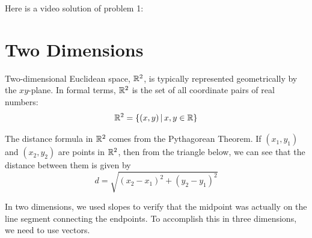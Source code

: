 \documentclass[handout]{ximera}
\begin{document}
Here is a video solution of problem 1:\\
\begin{foldable}
\end{foldable}


\section{Two Dimensions}
Two-dimensional Euclidean space, $\mathbb R^2$, is typically represented geometrically by the $xy$-plane. 
In formal terms, $\mathbb R^2$ is the set of all coordinate pairs of real numbers:
 \[
\mathbb R^2 = \{(x,y) \,|\, x, y \in \mathbb R\}
\]

The distance formula in $\mathbb R^2$ comes from the Pythagorean Theorem. If $(x_1, y_1)$ and $(x_2, y_2)$ are points in $\mathbb R^2$, then from the triangle below,
we can see that the distance between them is given by 
\[
d = \sqrt{(x_2 - x_1)^2 + (y_2 - y_1)^2}
\]






In two dimensions, we used slopes to verify that the midpoint was actually on the line segment connecting the endpoints.  
To accomplish this in three dimensions, we need to use vectors.
\end{document}
